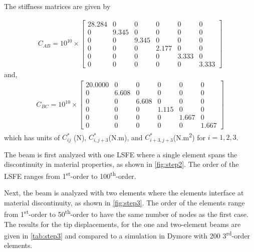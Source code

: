 \documentclass[letterpaper,12pt]{article}
\begin{document}
The stiffness matrices are given by

\begin{align*} 
C_{AB} = 10^{10}\times\begin{bmatrix}
	28.284 & 0     & 0     & 0      & 0      & 0      \\
	0       & 9.345 & 0     & 0      & 0      & 0      \\
	0       & 0     & 9.345 & 0      & 0      & 0      \\
	0       & 0     & 0     & 2.177  & 0  & 0 \\
	0       & 0     & 0     & 0  & 3.333  & 0 \\
	0       & 0     & 0     & 0 & 0 & 3.333
\end{bmatrix}
\end{align*}
and,
\begin{align*} 
C_{BC} = 10^{10}\times \begin{bmatrix}
	20.0000 & 0     & 0     & 0      & 0      & 0      \\
	0       & 6.608 & 0     & 0      & 0      & 0      \\
	0       & 0     & 6.608 & 0      & 0      & 0      \\
	0       & 0     & 0     & 1.115  & 0  & 0 \\
	0       & 0     & 0     & 0  & 1.667  & 0 \\
	0       & 0     & 0     & 0 & 0 & 1.667
\end{bmatrix}
\end{align*}
which has units of $C^*_{ij}$ (N), $C^*_{i,j+3}$(N.m), and $C^*_{i+3, j+3}$(N.m\textsuperscript{2}) for $i=1, 2, 3$.

The beam is first analyzed with one LSFE where a single element spans the discontinuity in material properties, as shown in \ref{fig:step2}. The order of the LSFE ranges from 1\textsuperscript{st}-order to 100\textsuperscript{th}-order. 


Next, the beam is analyzed with two elements where the elements interface at material discontinuity, as shown in \ref{fig:step3}. The order of the elements range from 1\textsuperscript{st}-order to 50\textsuperscript{th}-order to have the same number of nodes as the first case. The results for the tip displacements, for the one and two-element beams are given in \ref{tab:step3} and compared to a simulation in Dymore with 200 3\textsuperscript{rd}-order elements.
\end{document}
